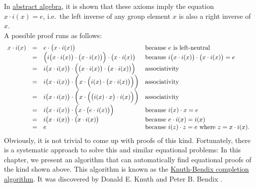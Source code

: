 In \href{https://en.wikipedia.org/wiki/Abstract_algebra}{abstract algebra}, it is shown that these axioms imply
the equation 
\\[0.2cm]
\hspace*{1.3cm}
$x \cdot i(x) = e$, \quad i.e.~the left inverse of any group element $x$ is also a right inverse of $x$.
\\[0.2cm]
A possible proof runs as follows:
$$
\begin{array}{lcll}
  x \cdot i(x) & = & e \cdot \bigl(x \cdot i(x)\bigr) & \mbox{because $e$ is left-neutral} \\
               & = & \Bigl(i\bigl(x \cdot i(x)\bigr) \cdot \bigl(x \cdot i(x)\bigr)\Bigr) \cdot \bigl(x \cdot i(x)\bigr)
                   & \mbox{because $i\bigl(x \cdot i(x)\bigr) \cdot \bigl(x \cdot i(x)\bigr) = e$} \\
               & = & i\bigl(x \cdot i(x)\bigr) \cdot \Bigl(\bigl(x \cdot i(x)\bigr) \cdot \bigl(x \cdot i(x)\bigr)\Bigr)
                   &  \mbox{associativity} \\
               & = & i\bigl(x \cdot i(x)\bigr) \cdot \biggl(x \cdot \Bigl(i(x) \cdot \bigl(x \cdot i(x)\bigr)\Bigr)\biggr) 
                   &  \mbox{associativity} \\
               & = & i\bigl(x \cdot i(x)\bigr) \cdot \biggl(x \cdot \Bigl(\bigl(i(x) \cdot x\bigr) \cdot i(x)\Bigr)\biggr) 
                   &  \mbox{associativity} \\
               & = & i\bigl(x \cdot i(x)\bigr) \cdot \Bigl(x \cdot \bigl(e \cdot i(x)\bigr)\Bigr) 
                   &  \mbox{because $i(x) \cdot x = e$} \\
               & = & i\bigl(x \cdot i(x)\bigr) \cdot \bigl(x \cdot i(x)\bigr) 
                   &  \mbox{because $e \cdot i(x) = i(x)$} \\
               & = & e 
                   & \mbox{because $i(z) \cdot z = e$ where $z = x \cdot i(x)$.}
\end{array}
$$
Obviously, it is not trivial to come up with proofs of this kind.  Fortunately, there is a systematic approach to
solve this and similar equational problems: In this chapter, we present an algorithm
that can automatically find equational proofs of the kind shown above.  This algorithm is known as the
\href{https://en.wikipedia.org/wiki/Knuth–Bendix_completion_algorithm}{Knuth-Bendix completion algorithm}.  It
was discovered by Donald E. Knuth and Peter B. Bendix \cite{knuth:1970}.

